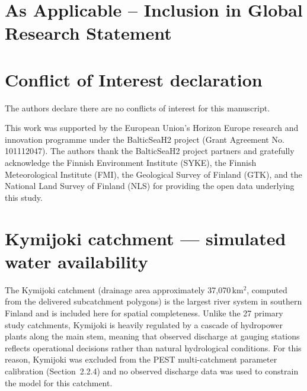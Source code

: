 \documentclass[draft]{agujournal2019}
\begin{document}
\section*{As Applicable – Inclusion in Global Research Statement}

\section*{Conflict of Interest declaration}
The authors declare there are no conflicts of interest for this manuscript.

\acknowledgments
This work was supported by the European Union's Horizon Europe research and innovation programme under the BalticSeaH2 project (Grant Agreement No. 101112047). The authors thank the BalticSeaH2 project partners and gratefully acknowledge the Finnish Environment Institute (SYKE), the Finnish Meteorological Institute (FMI), the Geological Survey of Finland (GTK), and the National Land Survey of Finland (NLS) for providing the open data underlying this study.



\appendix
\section{Kymijoki catchment --- simulated water availability}
\label{app:kymijoki}

The Kymijoki catchment (drainage area approximately 37,070\,km$^2$, computed from the delivered subcatchment polygons) is the largest river system in southern Finland and is included here for spatial completeness. Unlike the 27 primary study catchments, Kymijoki is heavily regulated by a cascade of hydropower plants along the main stem, meaning that observed discharge at gauging stations reflects operational decisions rather than natural hydrological conditions. For this reason, Kymijoki was excluded from the PEST multi-catchment parameter calibration (Section~2.2.4) and no observed discharge data was used to constrain the model for this catchment.
\end{document}
